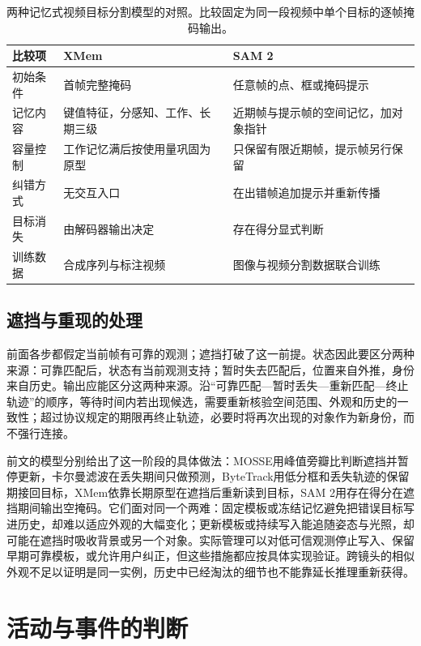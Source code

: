 \begin{table}[htbp]
  \centering
  \small
  \begin{tabularx}{\linewidth}{@{}lXX@{}}
    \toprule
    比较项 & XMem & SAM 2\\
    \midrule
    初始条件 & 首帧完整掩码 & 任意帧的点、框或掩码提示\\
    记忆内容 & 键值特征，分感知、工作、长期三级 & 近期帧与提示帧的空间记忆，加对象指针\\
    容量控制 & 工作记忆满后按使用量巩固为原型 & 只保留有限近期帧，提示帧另行保留\\
    纠错方式 & 无交互入口 & 在出错帧追加提示并重新传播\\
    目标消失 & 由解码器输出决定 & 存在得分显式判断\\
    训练数据 & 合成序列与标注视频 & 图像与视频分割数据联合训练\\
    \bottomrule
  \end{tabularx}
  \caption{两种记忆式视频目标分割模型的对照。比较固定为同一段视频中单个目标的逐帧掩码输出。}
  \label{tab:vision-video-memory-compare}
\end{table}

\subsection{遮挡与重现的处理}
\label{sec:vision-video-recovery}

前面各步都假定当前帧有可靠的观测；遮挡打破了这一前提。状态因此要区分两种来源：可靠匹配后，状态有当前观测支持；暂时失去匹配后，位置来自外推，身份来自历史。输出应能区分这两种来源。沿“可靠匹配—暂时丢失—重新匹配—终止轨迹”的顺序，等待时间内若出现候选，需要重新核验空间范围、外观和历史的一致性；超过协议规定的期限再终止轨迹，必要时将再次出现的对象作为新身份，而不强行连接。

前文的模型分别给出了这一阶段的具体做法：MOSSE用峰值旁瓣比判断遮挡并暂停更新，卡尔曼滤波在丢失期间只做预测，ByteTrack用低分框和丢失轨迹的保留期接回目标，XMem依靠长期原型在遮挡后重新读到目标，SAM 2用存在得分在遮挡期间输出空掩码。它们面对同一个两难：固定模板或冻结记忆避免把错误目标写进历史，却难以适应外观的大幅变化；更新模板或持续写入能追随姿态与光照，却可能在遮挡时吸收背景或另一个对象。实际管理可以对低可信观测停止写入、保留早期可靠模板，或允许用户纠正，但这些措施都应按具体实现验证。跨镜头的相似外观不足以证明是同一实例，历史中已经淘汰的细节也不能靠延长推理重新获得。

\section{活动与事件的判断}
\label{sec:vision-video-activities}

